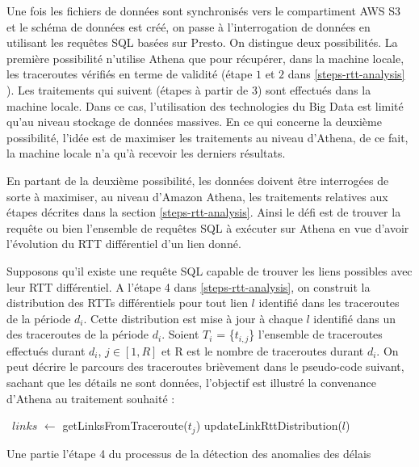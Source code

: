 Une fois les fichiers de données sont synchronisés vers le compartiment AWS S3 et le schéma  de données est créé, on passe à l'interrogation de données en utilisant les requêtes SQL basées sur Presto.  On distingue deux possibilités. La première possibilité n'utilise Athena que pour récupérer, dans la machine locale,  les traceroutes vérifiés en terme de validité (étape $1$ et $2$ dans \ref{steps-rtt-analysis} ).  Les traitements qui suivent (étapes  à partir de $3$) sont effectués dans la machine locale. Dans ce cas, l'utilisation des technologies du Big Data est limité qu'au niveau stockage de données massives. En ce qui concerne la deuxième possibilité, l'idée est de maximiser les traitements au niveau d'Athena, de ce fait, la machine locale n'a qu'à recevoir les derniers résultats.




En partant de la deuxième possibilité, les données doivent être interrogées de sorte à maximiser,  	au niveau d'Amazon Athena,  les traitements relatives aux étapes décrites dans la section \ref{steps-rtt-analysis}. Ainsi le défi est de trouver la requête ou bien l'ensemble de requêtes SQL à exécuter sur Athena en vue d'avoir l'évolution du RTT différentiel d'un lien donné.

Supposons qu'il existe une requête SQL capable de trouver les liens possibles avec leur RTT différentiel. A l'étape 4 dans \ref{steps-rtt-analysis}, on construit la distribution des RTTs différentiels pour tout lien $l$ identifié dans les traceroutes de la période $d_i$. Cette distribution est mise à jour à chaque $l$  identifié dans un des traceroutes  de la période $d_i$. Soient  $T_i$ = \{$t_{i, j}$\}  l'ensemble de traceroutes effectués durant $d_i$,  $j \in [1, R]$ et R est le nombre de traceroutes durant $d_i$. On peut décrire le parcours des traceroutes brièvement dans le pseudo-code suivant, sachant que les détails ne sont données, l'objectif est illustré la convenance d'Athena au traitement souhaité :
\begin{algorithm}[H]
\begin{algorithmic}[1]
	  \
	  \State $links$ $\leftarrow$ getLinksFromTraceroute($t_j$)
	  	 		\State updateLinkRttDistribution($l$) \label{update-link}
	  	 \EndFor
	 \EndFor
\end{algorithmic}
\caption{Une partie l'étape 4 du processus de la détection des anomalies des délais }
\label{alo-inference-link}
\end{algorithm}

